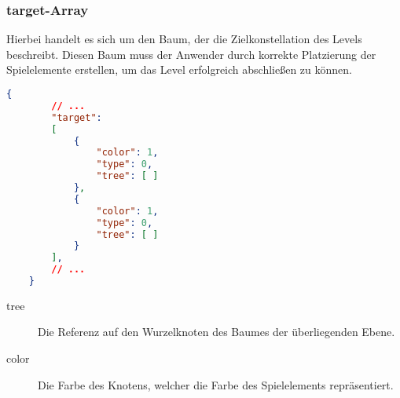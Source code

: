 \begin{minipage}{1\textwidth}

\subsubsection{target-Array}

Hierbei handelt es sich um den Baum, der die Zielkonstellation des Levels beschreibt. Diesen Baum muss der Anwender durch korrekte Platzierung der Spielelemente erstellen, um das Level erfolgreich abschließen zu können.

\begin{lstlisting}[language=json,firstnumber=1] 
	{	
		// ...
		"target": 
		[
            {
                "color": 1,
                "type": 0,
                "tree": [ ]
            },
            {
                "color": 1,
                "type": 0,
                "tree": [ ]
            }
        ],
		// ...
	}
\end{lstlisting}

\begin{description}
	\item[tree] Die Referenz auf den Wurzelknoten des Baumes der überliegenden Ebene.
	\item[color] Die Farbe des Knotens, welcher die Farbe des Spielelements repräsentiert.
\end{description}

\end{minipage}


